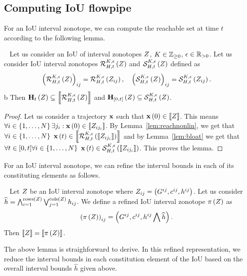 \subsection{Computing IoU flowpipe}
For an IoU interval zonotope, we can compute the reachable
set at time $t$ according to the following lemma.
%
\begin{lemma}~\label{lem:ioureach}
Let us consider an IoU of interval zonotopes $Z$,
$K\in\mathbb{Z}_{\geq 0}$, $\epsilon\in\mathbb{R}_{>0}$.  Let us consider
IoU interval zonotopes $\mathcal{R}_{H,t}^{K,\epsilon}\left(Z\right)$ and
$\mathcal{S}_{H,t}^{K,\epsilon}\left(Z\right)$ defined as
%
\begin{align*}
\left(\mathcal{R}_{H,t}^{K,\epsilon}\left(Z\right)\right)_{ij}
= \mathcal{R}_{H,t}^{K,\epsilon}\left(Z_{ij}\right),~~~
\left(\mathcal{S}_{H,t}^{K,\epsilon}\left(Z\right)\right)_{ij}
= \mathcal{S}_{H,t}^{K,\epsilon}\left(Z_{ij}\right).
\end{align*}
b%
Then
$\mathbf{H}_{t}\left(Z\right)\subseteq \left\llbracket{\mathcal{R}_{H,t}^{K,\epsilon}\left(Z\right)}\right\rrbracket$ and
$\mathbf{H}_{[0,t]}\left(Z\right)\subseteq \mathcal{S}_{H,t}^{K,\epsilon}\left(Z\right)$.
\end{lemma}
%
\begin{proof}
Let us consider a trajectory $\mathbf{x}$ such that $\mathbf{x}\left(0\right)\in\left\llbracket{Z}\right\rrbracket$.
This means $\forall i\in\left\{1,\ldots,N\right\} \exists
j_i:\mathbf{x}\left(0\right)\in\left\llbracket{Z_{ij_i}}\right\rrbracket$.  By Lemma~\ref{lem:reachnonlin}, we get
that $\forall
i\in\left\{1,\ldots,N\right\}~\mathbf{x}\left(t\right)\in\left\llbracket{\mathcal{R}_{H,t}^{K,\epsilon}\left(\left\llbracket{Z_{ij_i}}\right\rrbracket\right)}\right\rrbracket$
and by Lemma~\ref{lem:bloat} we get that $\forall t\in[0,t]\forall
i\in\left\{1,\ldots,N\right\}~\mathbf{x}\left(t\right)\in\mathcal{S}_{H,t}^{K,\epsilon}\left(\left\llbracket{Z_{ij_i}}\right\rrbracket\right)$.
This proves the lemma.
\end{proof}
%
For an IoU interval zonotope, we can refine the interval bounds in
each of its constituting elements as follows. 
%
\begin{lemma}~\label{lem:refine}
Let $Z$ be an IoU interval zonotope where $Z_{ij}
= \left(G^{ij},c^{ij},h^{ij}\right)$.  Let us consider $\widehat{h}
= \bigwedge_{i=1}^{\operatorname{rows}\left(Z\right)}\bigvee_{j=1}^{\operatorname{cols}\left(Z\right)}h_{ij}$.  We
define a refined IoU interval zonotope $\operatorname*{\pi}\left(Z\right)$ as
%
\[
\left(\operatorname*{\pi}\left(Z\right)\right)_{ij}
= \left(G^{ij},{c^{ij}},{h^{ij}\bigwedge \widehat{h}}\right).
\]
%
Then $\left\llbracket{Z}\right\rrbracket = \left\llbracket{\operatorname*{\pi}\left(Z\right)}\right\rrbracket$.
\end{lemma}
%
The above lemma is straighforward to derive.  In this refined
representation, we reduce the interval bounds in each constitution
element of the IoU based on the overall interval bounds $\widehat{h}$
given above.

